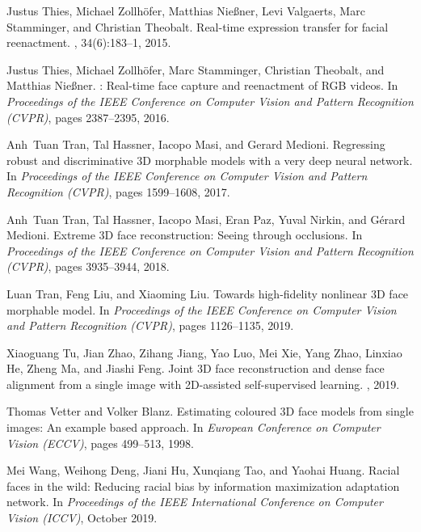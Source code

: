 \documentclass[final]{cvpr}
\begin{document}
{\begin{thebibliography}{10}
Justus Thies, Michael Zollh{\"o}fer, Matthias Nie{\ss}ner, Levi Valgaerts, Marc
  Stamminger, and Christian Theobalt.
\newblock Real-time expression transfer for facial reenactment.
, 34(6):183--1, 2015.

Justus Thies, Michael Zollh{\"o}fer, Marc Stamminger, Christian Theobalt, and
  Matthias Nie{\ss}ner.
: Real-time face capture and reenactment of {RGB} videos.
\newblock In {\em Proceedings of the IEEE Conference on Computer Vision and
  Pattern Recognition (CVPR)}, pages 2387--2395, 2016.

Anh~Tuan Tran, Tal Hassner, Iacopo Masi, and Gerard Medioni.
\newblock Regressing robust and discriminative {3D} morphable models with a
  very deep neural network.
\newblock In {\em Proceedings of the IEEE Conference on Computer Vision and
  Pattern Recognition (CVPR)}, pages 1599--1608, 2017.

Anh~Tuan Tran, Tal Hassner, Iacopo Masi, Eran Paz, Yuval Nirkin, and G{\'e}rard
  Medioni.
\newblock Extreme {3D} face reconstruction: Seeing through occlusions.
\newblock In {\em Proceedings of the IEEE Conference on Computer Vision and
  Pattern Recognition (CVPR)}, pages 3935--3944, 2018.

Luan Tran, Feng Liu, and Xiaoming Liu.
\newblock Towards high-fidelity nonlinear {3D} face morphable model.
\newblock In {\em Proceedings of the IEEE Conference on Computer Vision and
  Pattern Recognition (CVPR)}, pages 1126--1135, 2019.

Xiaoguang Tu, Jian Zhao, Zihang Jiang, Yao Luo, Mei Xie, Yang Zhao, Linxiao He,
  Zheng Ma, and Jiashi Feng.
\newblock Joint {3D} face reconstruction and dense face alignment from a single
  image with {2D}-assisted self-supervised learning.
, 2019.

Thomas Vetter and Volker Blanz.
\newblock Estimating coloured {3D} face models from single images: An example
  based approach.
\newblock In {\em European Conference on Computer Vision (ECCV)}, pages
  499--513, 1998.

Mei Wang, Weihong Deng, Jiani Hu, Xunqiang Tao, and Yaohai Huang.
\newblock Racial faces in the wild: Reducing racial bias by information
  maximization adaptation network.
\newblock In {\em Proceedings of the IEEE International Conference on Computer
  Vision (ICCV)}, October 2019.


\end{thebibliography}}
\end{document}
